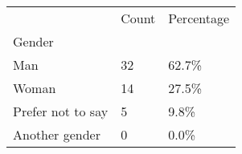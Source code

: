 \documentclass{article}
\begin{document}
\begin{table}
\centering
\begin{tabular}{lll}
\toprule
{} & Count & Percentage \\
Gender            &       &            \\
\midrule
Man               &    32 &      62.7\% \\
Woman             &    14 &      27.5\% \\
Prefer not to say &     5 &       9.8\% \\
Another gender &     0 &       0.0\% \\
\bottomrule
\end{tabular}

\end{table}
\end{document}
